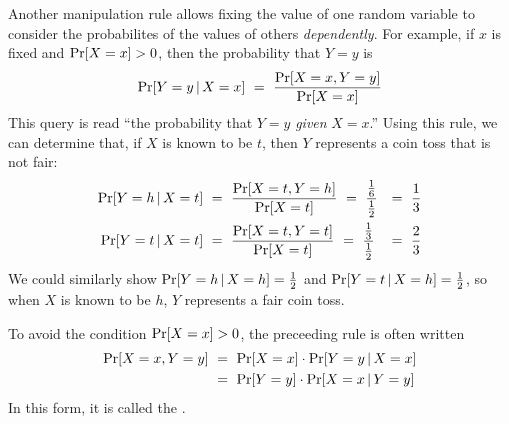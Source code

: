 Another manipulation rule allows fixing the value of one random variable to consider the probabilites of the values of others \emph{dependently}.
For example, if $x$ is fixed and $\mathrm{Pr}\!\left[{X = x}\right] > 0$, then the probability that $Y = y$ is
\begin{equation}
	\Pspec{Y = y \given X = x}\ =\ \frac{\Pspec{X = x,Y = y}}{\Pspec{X = x}}
\end{equation}
This  query is read ``the probability that $Y = y$ \emph{given} $X = x$.''
Using this rule, we can determine that, if $X$ is known to be $t$, then $Y$ represents a coin toss that is not fair:
\begin{equation}
\begin{aligned}
	\Pspec{Y = h \given X = t}&\ =\ \frac{\Pspec{X = t,Y = h}}{\Pspec{X = t}}\ =\ \frac{\frac{1}{6}}{\frac{1}{2}}&=\ \frac{1}{3}
\\
	\Pspec{Y = t \given X = t}&\ =\ \frac{\Pspec{X = t,Y = t}}{\Pspec{X = t}}\ =\ \frac{\frac{1}{3}}{\frac{1}{2}}&=\ \frac{2}{3}
\end{aligned}
\end{equation}
We could similarly show $\mathrm{Pr}\!\left[{Y = h \,|\, X = h}\right] = \frac{1}{2}$ and $\mathrm{Pr}\!\left[{Y = t \,|\, X = h}\right] = \frac{1}{2}$, so when $X$ is known to be $h$, $Y$ represents a fair coin toss.

To avoid the condition $\mathrm{Pr}\!\left[{X = x}\right] > 0$, the preceeding rule is often written
\begin{equation}
\begin{aligned}
	\mathrm{Pr}\!\left[{X = x, Y = y}\right]&\ =\ \mathrm{Pr}\!\left[{X = x}\right] \cdot \mathrm{Pr}\!\left[{Y = y \,|\, X = x}\right] \\
	&\ =\ \mathrm{Pr}\!\left[{Y = y}\right] \cdot \mathrm{Pr}\!\left[{X = x \,|\, Y = y}\right]
\end{aligned}
\end{equation}
In this form, it is called the .

